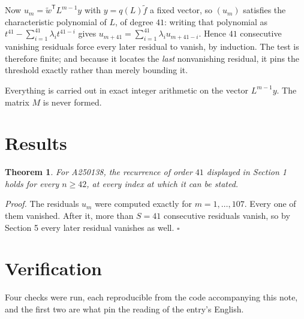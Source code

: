 \documentclass[11pt]{article}
\newtheorem{theorem}{Theorem}
\theoremstyle{definition}
\begin{document}
Now $u_m = \tilde w^{\mathsf T} L^{m-1} y$ with $y = q(L)\tilde f$ a fixed vector, so $(u_m)$ satisfies the characteristic polynomial of $L$, of degree $41$: writing that polynomial as $t^{41} - \sum_{i=1}^{41} \lambda_i t^{41-i}$ gives $u_{m+41} = \sum_{i=1}^{41} \lambda_i u_{m+41-i}$. Hence $41$ consecutive vanishing residuals force every later residual to vanish, by induction. The test is therefore finite; and because it locates the {\itshape last} nonvanishing residual, it pins the threshold exactly rather than merely bounding it.

Everything is carried out in exact integer arithmetic on the vector $L^{m-1}y$. The matrix $M$ is never formed.

\section{Results}

\begin{theorem} For A250138, the recurrence of order $41$ displayed in Section 1 holds for every $n \ge 42$, at every index at which it can be stated.\end{theorem}

{\itshape Proof.} The residuals $u_m$ were computed exactly for $m = 1,\dots,107$. Every one of them vanished. After it, more than $S = 41$ consecutive residuals vanish, so by Section 5 every later residual vanishes as well. $\square$

\section{Verification}

Four checks were run, each reproducible from the code accompanying this note, and the first two are what pin the reading of the entry's English.
\end{document}
